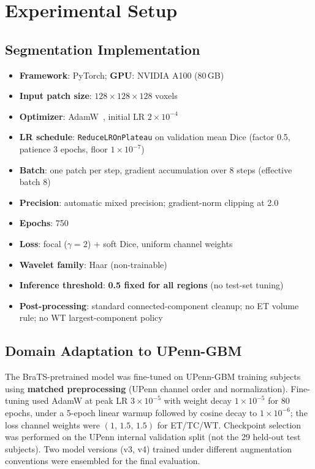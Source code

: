 \documentclass[conference]{IEEEtran}
\begin{document}
\section{Experimental Setup}
\label{sec:experiments}

\subsection{Segmentation Implementation}

\begin{itemize}
    \item \textbf{Framework}: PyTorch; \textbf{GPU}: NVIDIA A100 (80\,GB)
    \item \textbf{Input patch size}: $128\times128\times128$ voxels
    \item \textbf{Optimizer}: AdamW~\cite{loshchilov2019adamw}, initial LR $2\times10^{-4}$
    \item \textbf{LR schedule}: \texttt{ReduceLROnPlateau} on validation mean Dice (factor 0.5, patience 3 epochs, floor $1\times10^{-7}$)
    \item \textbf{Batch}: one patch per step, gradient accumulation over 8 steps (effective batch 8)
    \item \textbf{Precision}: automatic mixed precision; gradient-norm clipping at 2.0
    \item \textbf{Epochs}: 750
    \item \textbf{Loss}: focal ($\gamma=2$) + soft Dice, uniform channel weights
    \item \textbf{Wavelet family}: Haar (non-trainable)
    \item \textbf{Inference threshold}: \textbf{0.5 fixed for all regions} (no test-set tuning)
    \item \textbf{Post-processing}: standard connected-component cleanup; no ET volume rule; no WT largest-component policy
\end{itemize}

\subsection{Domain Adaptation to UPenn-GBM}

The BraTS-pretrained model was fine-tuned on UPenn-GBM training subjects using \textbf{matched preprocessing} (UPenn channel order and normalization). Fine-tuning used AdamW at peak LR $3\times10^{-5}$ with weight decay $1\times10^{-5}$ for 80 epochs, under a 5-epoch linear warmup followed by cosine decay to $1\times10^{-6}$; the loss channel weights were $(1,\,1.5,\,1.5)$ for ET/TC/WT. Checkpoint selection was performed on the UPenn internal validation split (not the 29 held-out test subjects). Two model versions (v3, v4) trained under different augmentation conventions were ensembled for the final evaluation.
\end{document}
